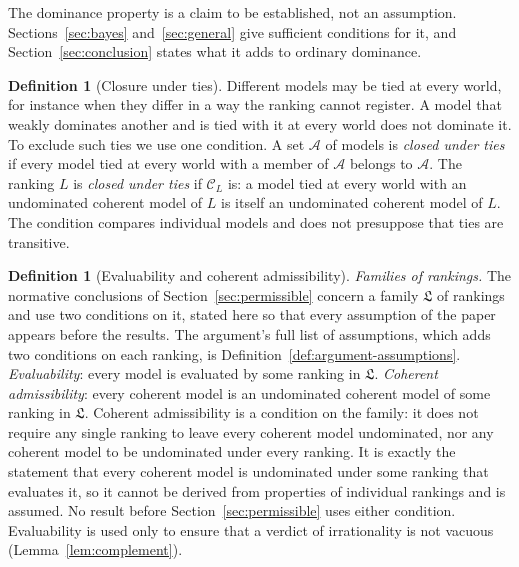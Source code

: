 \documentclass[11pt]{article}
\theoremstyle{definition}
\newtheorem{definition}[theorem]{Definition}
\theoremstyle{remark}
\newcommand{\C}{\mathcal C}
\newcommand{\Lf}{\mathfrak L}
\begin{document}
The dominance property is a claim to be established, not an assumption. Sections~\ref{sec:bayes} and~\ref{sec:general} give sufficient conditions for it, and Section~\ref{sec:conclusion} states what it adds to ordinary dominance.

\begin{definition}[Closure under ties]\label{def:tie-closure}
Different models may be tied at every world, for instance when they differ in a way the ranking cannot register. A model that weakly dominates another and is tied with it at every world does not dominate it. To exclude such ties we use one condition. A set $\mathcal A$ of models is \emph{closed under ties} if every model tied at every world with a member of $\mathcal A$ belongs to $\mathcal A$. The ranking $L$ is \emph{closed under ties} if $\C_L$ is: a model tied at every world with an undominated coherent model of $L$ is itself an undominated coherent model of $L$. The condition compares individual models and does not presuppose that ties are transitive.
\end{definition}

\begin{definition}[Evaluability and coherent admissibility]\label{def:family-assumptions}
\emph{Families of rankings.} The normative conclusions of Section~\ref{sec:permissible} concern a family $\Lf$ of rankings and use two conditions on it, stated here so that every assumption of the paper appears before the results. The argument's full list of assumptions, which adds two conditions on each ranking, is Definition~\ref{def:argument-assumptions}. \emph{Evaluability}: every model is evaluated by some ranking in $\Lf$. \emph{Coherent admissibility}: every coherent model is an undominated coherent model of some ranking in $\Lf$. Coherent admissibility is a condition on the family: it does not require any single ranking to leave every coherent model undominated, nor any coherent model to be undominated under every ranking. It is exactly the statement that every coherent model is undominated under some ranking that evaluates it, so it cannot be derived from properties of individual rankings and is assumed. No result before Section~\ref{sec:permissible} uses either condition. Evaluability is used only to ensure that a verdict of irrationality is not vacuous (Lemma~\ref{lem:complement}).
\end{definition}
\end{document}
